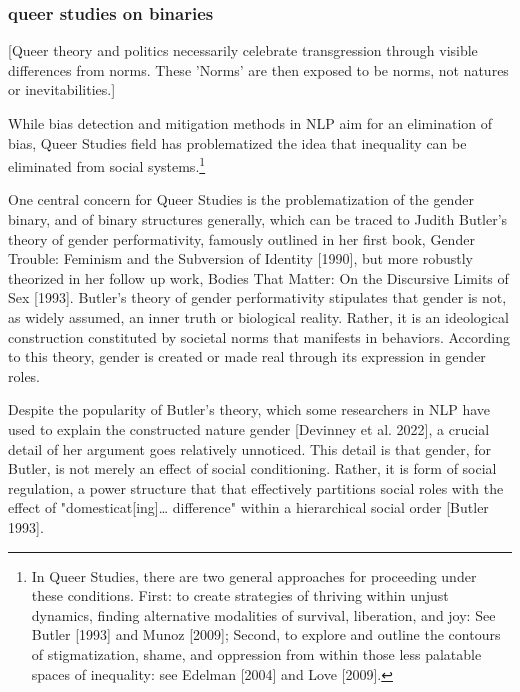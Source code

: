 \documentclass[11pt]{article}
\begin{document}
\subsubsection{queer studies on binaries}
\label{sec:org32a0a74}


[Queer theory and politics necessarily celebrate transgression through
visible differences from norms. These 'Norms' are then exposed to be
norms, not natures or inevitabilities.]


While bias detection and mitigation methods in NLP aim for an
elimination of bias, Queer Studies field has problematized the idea
that inequality can be eliminated from social systems.\footnote{In Queer Studies, there are two general approaches for
proceeding under these conditions. First: to create strategies of
thriving within unjust dynamics, finding alternative modalities of
survival, liberation, and joy: See Butler [1993] and Munoz [2009];
Second, to explore and outline the contours of stigmatization, shame,
and oppression from within those less palatable spaces of inequality:
see Edelman [2004] and Love [2009].}

One central concern for Queer Studies is the problematization of the
gender binary, and of binary structures generally, which can be traced
to Judith Butler's theory of gender performativity, famously outlined
in her first book, Gender Trouble: Feminism and the Subversion of
Identity [1990], but more robustly theorized in her follow up work,
Bodies That Matter: On the Discursive Limits of Sex [1993]. Butler's
theory of gender performativity stipulates that gender is not, as
widely assumed, an inner truth or biological reality. Rather, it is an
ideological construction constituted by societal norms that manifests
in behaviors. According to this theory, gender is created or made real
through its expression in gender roles. 

Despite the popularity of Butler's theory, which some researchers in
NLP have used to explain the constructed nature gender [Devinney et
al. 2022], a crucial detail of her argument goes relatively unnoticed.
This detail is that gender, for Butler, is not merely an effect of
social conditioning. Rather, it is form of social regulation, a power
structure that that effectively partitions social roles with the
effect of "domesticat[ing]… difference" within a hierarchical social
order [Butler 1993].
\end{document}
